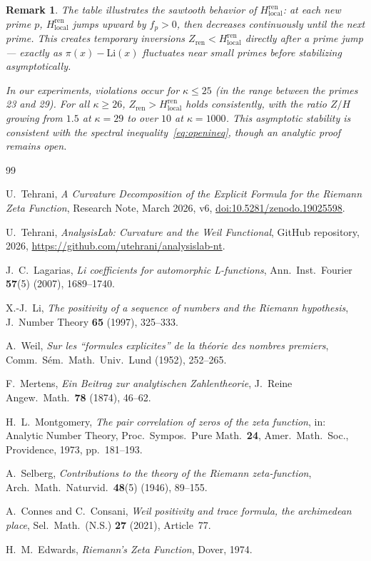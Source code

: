 \documentclass[11pt]{article}
\newtheorem*{remark*}{Remark}
\begin{document}
\begin{remark*}
The table illustrates the sawtooth behavior of
$H_{\mathrm{local}}^{\mathrm{ren}}$: at each new prime $p$,
$H_{\mathrm{local}}^{\mathrm{ren}}$ jumps upward by $f_p > 0$,
then decreases continuously until the next prime.
This creates temporary inversions $Z_{\mathrm{ren}} < H_{\mathrm{local}}^{\mathrm{ren}}$
directly after a prime jump — exactly as $\pi(x) - \mathrm{Li}(x)$
fluctuates near small primes before stabilizing asymptotically.

In our experiments, violations occur for $\kappa \le 25$
(in the range between the primes 23 and 29).
For all $\kappa \ge 26$, $Z_{\mathrm{ren}} > H_{\mathrm{local}}^{\mathrm{ren}}$
holds consistently, with the ratio $Z/H$ growing from $1.5$ at $\kappa=29$
to over $10$ at $\kappa=1000$.
This asymptotic stability is consistent with the spectral
inequality~\eqref{eq:openineq}, though an analytic proof remains open.
\end{remark*}

\begin{thebibliography}{99}

U.~Tehrani,
\emph{A Curvature Decomposition of the Explicit Formula
for the Riemann Zeta Function},
Research Note, March 2026, v6,
\href{https://doi.org/10.5281/zenodo.19025598}{%
doi:10.5281/zenodo.19025598}.

U.~Tehrani,
\emph{AnalysisLab: Curvature and the Weil Functional},
GitHub repository, 2026,
\url{https://github.com/utehrani/analysislab-nt}.

J.~C.~Lagarias,
\emph{Li coefficients for automorphic L-functions},
Ann.\ Inst.\ Fourier \textbf{57}(5) (2007), 1689--1740.

X.-J.~Li,
\emph{The positivity of a sequence of numbers
and the Riemann hypothesis},
J.\ Number Theory \textbf{65} (1997), 325--333.

A.~Weil,
\emph{Sur les ``formules explicites'' de la
th\'eorie des nombres premiers},
Comm.\ S\'em.\ Math.\ Univ.\ Lund (1952), 252--265.

F.~Mertens,
\emph{Ein Beitrag zur analytischen Zahlentheorie},
J.\ Reine Angew.\ Math.\ \textbf{78} (1874), 46--62.

H.~L.~Montgomery,
\emph{The pair correlation of zeros of the zeta function},
in: Analytic Number Theory, Proc.\ Sympos.\ Pure Math.\ \textbf{24},
Amer.\ Math.\ Soc., Providence, 1973, pp.\ 181--193.

A.~Selberg,
\emph{Contributions to the theory of the Riemann zeta-function},
Arch.\ Math.\ Naturvid.\ \textbf{48}(5) (1946), 89--155.

A.~Connes and C.~Consani,
\emph{Weil positivity and trace formula, the archimedean place},
Sel.\ Math.\ (N.S.) \textbf{27} (2021), Article~77.

H.~M.~Edwards,
\emph{Riemann's Zeta Function},
Dover, 1974.

\end{thebibliography}
\end{document}

